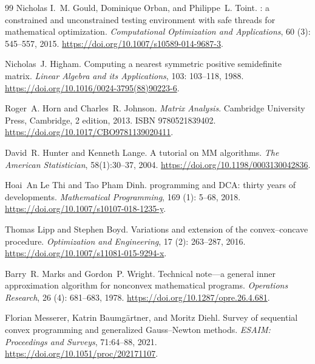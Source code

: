 \documentclass[pdflatex,sn-mathphys-num]{sn-jnl}
\theoremstyle{thmstyleone}
\theoremstyle{thmstylethree}
\newcounter{algorithm}
\begin{document}
\begin{thebibliography}{99}
Nicholas I.~M. Gould, Dominique Orban, and Philippe~L. Toint.
: a constrained and unconstrained testing environment with
  safe threads for mathematical optimization.
\newblock \emph{Computational Optimization and Applications}, 60
  (3): 545--557, 2015.
\newblock \url{https://doi.org/10.1007/s10589-014-9687-3}.

Nicholas~J. Higham.
\newblock Computing a nearest symmetric positive semidefinite matrix.
\newblock \emph{Linear Algebra and its Applications}, 103: 103--118,
  1988.
\newblock \url{https://doi.org/10.1016/0024-3795(88)90223-6}.

Roger~A. Horn and Charles~R. Johnson.
\newblock \emph{Matrix Analysis}.
\newblock Cambridge University Press, Cambridge, 2 edition, 2013.
\newblock ISBN 9780521839402.
\newblock \url{https://doi.org/10.1017/CBO9781139020411}.

David~R. Hunter and Kenneth Lange.
\newblock A tutorial on MM algorithms.
\newblock \emph{The American Statistician}, 58(1):30--37, 2004.
\newblock \url{https://doi.org/10.1198/0003130042836}.

Hoai~An {Le Thi} and Tao {Pham Dinh}.
 programming and {DCA}: thirty years of developments.
\newblock \emph{Mathematical Programming}, 169 (1): 5--68,
  2018.
\newblock \url{https://doi.org/10.1007/s10107-018-1235-y}.

Thomas Lipp and Stephen Boyd.
\newblock Variations and extension of the convex--concave procedure.
\newblock \emph{Optimization and Engineering}, 17 (2):
  263--287, 2016.
\newblock \url{https://doi.org/10.1007/s11081-015-9294-x}.

Barry~R. Marks and Gordon~P. Wright.
\newblock Technical note---a general inner approximation algorithm for
  nonconvex mathematical programs.
\newblock \emph{Operations Research}, 26 (4): 681--683, 1978.
\newblock \url{https://doi.org/10.1287/opre.26.4.681}.

Florian Messerer, Katrin Baumg\"artner, and Moritz Diehl.
\newblock Survey of sequential convex programming and generalized
  Gauss--Newton methods.
\newblock \emph{ESAIM: Proceedings and Surveys}, 71:64--88, 2021.
\newblock \url{https://doi.org/10.1051/proc/202171107}.


\end{thebibliography}
\end{document}
